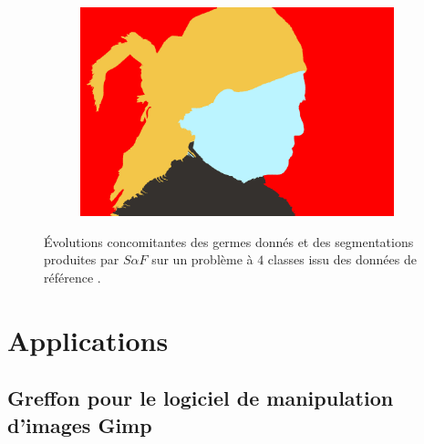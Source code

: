 \begin{figure}[htb]
\begin{subfigure}{0.4\textwidth}
 \end{subfigure}
 ~
 \begin{subfigure}{0.4\textwidth}	
\includegraphics[width=\textwidth]{images/evaluation/010_res3.jpg}
 \end{subfigure}
\caption{Évolutions concomitantes des germes donnés et des segmentations produites par $S \alpha F$ sur un problème à $4$ classes issu des données de référence .}
	\label{fig:eval:Algo-predictability-3}
\end{figure} 


\section{Applications}
 
\subsection{Greffon pour le logiciel de manipulation d'images Gimp}

